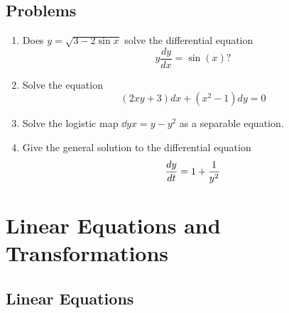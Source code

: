 \documentclass[12pt]{book}
\begin{document}
\section{Problems}

\begin{enumerate}
\item
  Does $y = \sqrt{3-2\sin x}$ solve the differential equation
  \begin{dmath*}
    y\frac{dy}{dx}=\sin(x)?
  \end{dmath*}

\item
  Solve the equation
  \begin{dmath*}
    (2xy + 3) dx + (x^2 - 1) dy = 0
  \end{dmath*}

\item
  Solve the logistic map $\dd{y}{x} = y - y^2$ as a separable equation.

\item
  Give the general solution to the differential equation
  \begin{dmath*}
    \ddt{y} = 1 + \frac{1}{y^2}
  \end{dmath*}

\end{enumerate}



\chapter{Linear Equations and Transformations}

\section{Linear Equations}
\end{document}
